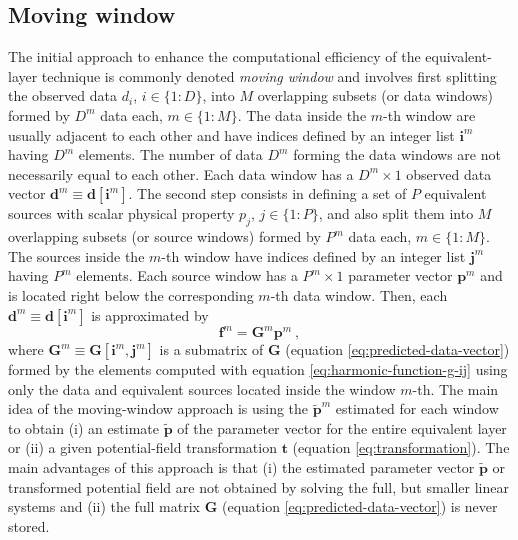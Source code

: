 \subsection{Moving window}

The initial approach to enhance the computational efficiency of the equivalent-layer technique 
is commonly denoted \textit{moving window} and involves
first splitting the observed data $d_{i}$, $i \in \{1 : D\}$, into $M$ overlapping subsets (or data windows) 
formed by $D^{m}$ data each, $m \in \{ 1 : M \}$.
The data inside the $m$-th window are usually adjacent to each other and have indices defined by an 
integer list $\mathbf{i}^{m}$ having $D^{m}$ elements.
The number of data $D^{m}$ forming the data windows are not necessarily equal to each other.
Each data window has a $D^{m} \times 1$ observed data vector $\mathbf{d}^{m} \equiv \mathbf{d}[\mathbf{i}^{m}]$.
The second step consists in defining a set of $P$ equivalent sources with scalar physical property $p_{j}$, $j \in \{1:P\}$,
and also split them into $M$ overlapping subsets (or source windows) formed by $P^{m}$ data each, $m \in \{ 1 : M \}$.
The sources inside the $m$-th window have indices defined by an integer list $\mathbf{j}^{m}$ having $P^{m}$ elements.
Each source window has a $P^{m} \times 1$ parameter vector $\mathbf{p}^{m}$ and
is located right below the corresponding $m$-th data window. 
Then, each $\mathbf{d}^{m} \equiv \mathbf{d}[\mathbf{i}^{m}]$ is approximated by 
\begin{equation}
	\mathbf{f}^{m} = \mathbf{G}^{m} \mathbf{p}^{m} \: ,
	\label{eq:predicted-data-window-m}
\end{equation}
where $\mathbf{G}^{m} \equiv \mathbf{G}[\mathbf{i}^{m}, \mathbf{j}^{m}]$ is a submatrix of 
$\mathbf{G}$ (equation \ref{eq:predicted-data-vector}) formed by the elements computed with equation 
\ref{eq:harmonic-function-g-ij} using only the data and equivalent sources located inside the window $m$-th.
The main idea of the moving-window approach is using the $\tilde{\mathbf{p}}^{m}$ estimated for 
each window to obtain (i) an estimate $\tilde{\mathbf{p}}$ of the parameter vector for the entire equivalent layer
or (ii) a given potential-field transformation $\mathbf{t}$ (equation \ref{eq:transformation}).
The main advantages of this approach is that (i) the estimated parameter vector $\tilde{\mathbf{p}}$ or transformed potential field
are not obtained by solving the full, but smaller linear systems and (ii) the full matrix $\mathbf{G}$ (equation \ref{eq:predicted-data-vector})
is never stored.

